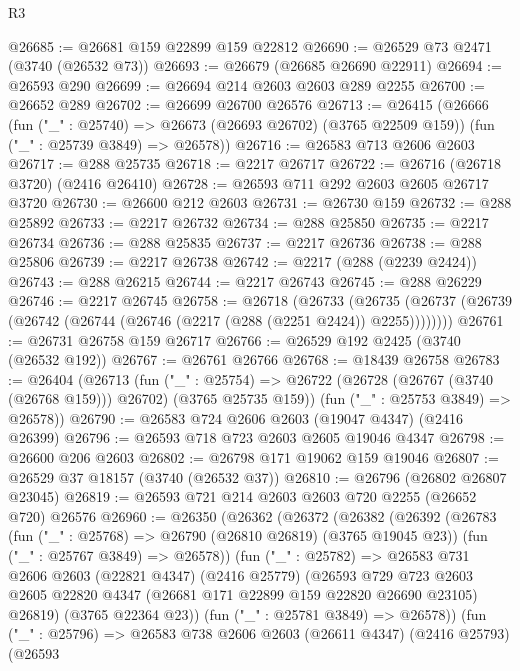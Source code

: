 \begin{lexlean}{R3}
\begin{coremodule}
@26685 := @26681 @159 @22899 @159 @22812
@26690 := @26529 @73 @2471 (@3740 (@26532 @73))
@26693 := @26679 (@26685 @26690 @22911)
@26694 := @26593 @290
@26699 := @26694 @214 @2603 @2603 @289 @2255
@26700 := @26652 @289
@26702 := @26699 @26700 @26576
@26713 := @26415
    (@26666
      (fun ("_" : @25740) => @26673 (@26693 @26702) (@3765 @22509 @159))
      (fun ("_" : @25739 @3849) => @26578))
@26716 := @26583 @713 @2606 @2603
@26717 := @288 @25735
@26718 := @2217 @26717
@26722 := @26716 (@26718 @3720) (@2416 @26410)
@26728 := @26593 @711 @292 @2603 @2605 @26717 @3720
@26730 := @26600 @212 @2603
@26731 := @26730 @159
@26732 := @288 @25892
@26733 := @2217 @26732
@26734 := @288 @25850
@26735 := @2217 @26734
@26736 := @288 @25835
@26737 := @2217 @26736
@26738 := @288 @25806
@26739 := @2217 @26738
@26742 := @2217 (@288 (@2239 @2424))
@26743 := @288 @26215
@26744 := @2217 @26743
@26745 := @288 @26229
@26746 := @2217 @26745
@26758 := @26718
    (@26733
      (@26735 (@26737 (@26739 (@26742 (@26744 (@26746 (@2217 (@288 (@2251 @2424)) @2255))))))))
@26761 := @26731 @26758 @159 @26717
@26766 := @26529 @192 @2425 (@3740 (@26532 @192))
@26767 := @26761 @26766
@26768 := @18439 @26758
@26783 := @26404
    (@26713
      (fun ("_" : @25754) =>
      @26722 (@26728 (@26767 (@3740 (@26768 @159))) @26702) (@3765 @25735 @159))
      (fun ("_" : @25753 @3849) => @26578))
@26790 := @26583 @724 @2606 @2603 (@19047 @4347) (@2416 @26399)
@26796 := @26593 @718 @723 @2603 @2605 @19046 @4347
@26798 := @26600 @206 @2603
@26802 := @26798 @171 @19062 @159 @19046
@26807 := @26529 @37 @18157 (@3740 (@26532 @37))
@26810 := @26796 (@26802 @26807 @23045)
@26819 := @26593 @721 @214 @2603 @2603 @720 @2255 (@26652 @720) @26576
@26960 := @26350
    (@26362
      (@26372
        (@26382
          (@26392
            (@26783
              (fun ("_" : @25768) => @26790 (@26810 @26819) (@3765 @19045 @23))
              (fun ("_" : @25767 @3849) => @26578))
            (fun ("_" : @25782) =>
            @26583
              @731
              @2606
              @2603
              (@22821 @4347)
              (@2416 @25779)
              (@26593
                @729
                @723
                @2603
                @2605
                @22820
                @4347
                (@26681 @171 @22899 @159 @22820 @26690 @23105)
                @26819)
              (@3765 @22364 @23))
            (fun ("_" : @25781 @3849) => @26578))
          (fun ("_" : @25796) =>
          @26583
            @738
            @2606
            @2603
            (@26611 @4347)
            (@2416 @25793)
            (@26593

\end{coremodule}
\end{lexlean}
